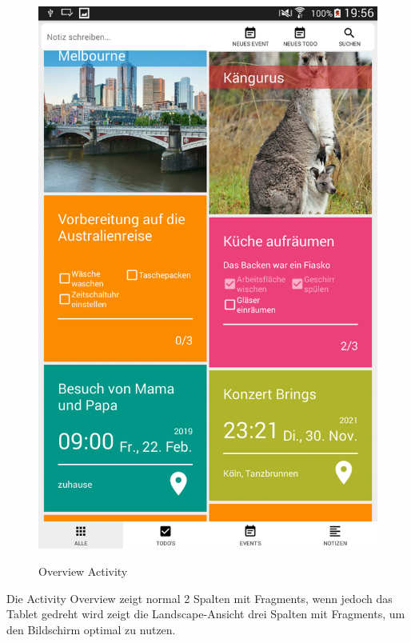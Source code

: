 \begin{figure}[H]
\centering
\begin{minipage}[t]{1\textwidth} %
\caption{Overview Activity} %
\includegraphics[width=1\textwidth]{img/Overview}\\ %
\end{minipage}
\end{figure}

Die Activity Overview zeigt normal 2 Spalten mit Fragments, wenn jedoch das Tablet gedreht wird zeigt die Landscape-Ansicht drei Spalten mit Fragments, um den Bildschirm optimal zu nutzen.

